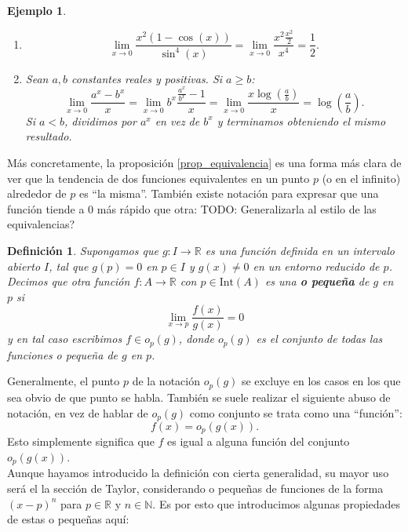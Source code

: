 \documentclass{article}
\newtheorem{define}{Definición}
\newtheorem{ejem}{Ejemplo}
\newcommand{\reales}{\mathbb{R}}
\newcommand{\naturales}{\mathbb{N}}
\newcommand{\interior}[1]{\text{Int}(#1)}
\begin{document}
\begin{ejem}
	\begin{enumerate}
		\item
		\begin{equation*}
			\lim_{x\rightarrow 0} \frac{x^2(1-\cos(x))}{\sin^4(x)} = \lim_{x\rightarrow 0} \frac{x^2 \frac{x^2}{2}}{x^4} = \frac{1}{2}.
		\end{equation*}
		\item
		Sean $a, b$ constantes reales y positivas. Si $a \geq b$:
		\begin{equation*}
			\lim_{x\rightarrow 0} \frac{a^x - b^x}{x} = \lim_{x\rightarrow 0} b^x \frac{\frac{a^x}{b^x} - 1}{x} = \lim_{x\rightarrow 0} \frac{x\log(\frac{a}{b})}{x} = \log(\frac{a}{b}).
		\end{equation*}
		Si $a < b$, dividimos por $a^x$ en vez de $b^x$ y terminamos obteniendo el mismo resultado.
	\end{enumerate}
\end{ejem}

Más concretamente, la proposición \eqref{prop_equivalencia} es una forma más clara de ver que la tendencia de dos funciones equivalentes en un punto $p$ (o en el infinito) alrededor de $p$ es ``la misma''. También existe notación para expresar que una función tiende a $0$ más rápido que otra:
TODO: Generalizarla al estilo de las equivalencias?
\begin{define}
	Supongamos que $g: I \rightarrow \reales$ es una función definida en un intervalo abierto $I$, tal que $g(p) = 0$ en $p \in I$ y $g(x) \neq 0$ en un entorno reducido de $p$. Decimos que otra función $f: A \rightarrow \reales$ con $p \in \interior{A}$ es una \textbf{o pequeña} de $g$ en $p$ si
	\begin{equation*}
		\lim_{x \rightarrow p} \frac{f(x)}{g(x)} = 0
	\end{equation*}
	y en tal caso escribimos $f \in o_{p}(g)$, donde $o_{p}(g)$ es el conjunto de todas las funciones o pequeña de $g$ en $p$.
\end{define}

Generalmente, el punto $p$ de la notación $o_{p}(g)$ se excluye en los casos en los que sea obvio de que punto se habla. También se suele realizar el siguiente abuso de notación, en vez de hablar de $o_{p}(g)$ como conjunto se trata como una ``función'':
\begin{equation*}
	f(x) = o_p (g(x)).
\end{equation*}
Esto simplemente significa que $f$ es igual a alguna función del conjunto $o_p(g(x))$.\\ 
Aunque hayamos introducido la definición con cierta generalidad, su mayor uso será el la sección de Taylor, considerando o pequeñas de funciones de la forma $(x-p)^n$ para $p \in \reales$ y $n \in \naturales$. Es por esto que introducimos algunas propiedades de estas o pequeñas aquí:
\end{document}
